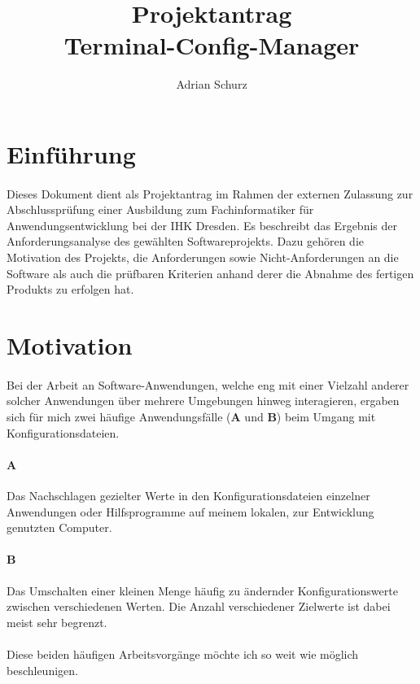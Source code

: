 \documentclass[a4paper,11pt]{article}
\author{Adrian Schurz}
\title{Projektantrag\\[0.2em]\smaller{}Terminal-Config-Manager}
\begin{document}
\maketitle
{}
\newpage
{}
\tableofcontents

\section{Einführung}
\paragraph{}
Dieses Dokument dient als Projektantrag im Rahmen der externen Zulassung
zur Abschlussprüfung einer Ausbildung zum Fachinformatiker für
Anwendungsentwicklung bei der IHK Dresden. Es beschreibt das Ergebnis der
Anforderungsanalyse des gewählten Softwareprojekts. Dazu gehören die
Motivation des Projekts, die Anforderungen sowie Nicht-Anforderungen an
die Software als auch die prüfbaren Kriterien anhand derer die Abnahme des
fertigen Produkts zu erfolgen hat.

\section{Motivation}
\paragraph{}
Bei der Arbeit an Software-Anwendungen, welche eng mit einer Vielzahl anderer
solcher Anwendungen über mehrere Umgebungen hinweg interagieren, ergaben sich
für mich zwei häufige Anwendungsfälle (\textbf{A} und \textbf{B}) beim Umgang mit
Konfigurationsdateien.
\paragraph{A}
Das Nachschlagen gezielter Werte in den Konfigurationsdateien
einzelner Anwendungen oder Hilfsprogramme auf meinem lokalen, zur Entwicklung
genutzten Computer.
\paragraph{B}
Das Umschalten einer kleinen Menge häufig zu ändernder Konfigurationswerte
zwischen verschiedenen Werten. Die Anzahl verschiedener Zielwerte ist dabei
meist sehr begrenzt.
\paragraph{}
Diese beiden häufigen Arbeitsvorgänge möchte ich so weit wie möglich beschleunigen.
\end{document}
